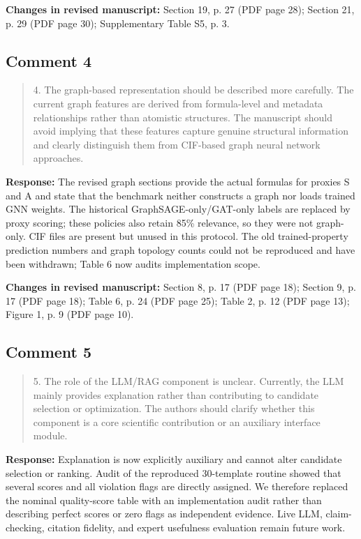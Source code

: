 \documentclass[11pt,a4paper]{article}
\begin{document}
\textbf{Changes in revised manuscript:} Section 19, p. 27 (PDF page 28); Section 21, p. 29 (PDF page 30); Supplementary Table S5, p. 3.

\subsection*{Comment 4}
\begin{quote}\small 4. The graph-based representation should be described more carefully. The current graph features are derived from formula-level and metadata relationships rather than atomistic structures. The manuscript should avoid implying that these features capture genuine structural information and clearly distinguish them from CIF-based graph neural network approaches.\end{quote}
\textbf{Response:} The revised graph sections provide the actual formulas for proxies S and A and state that the benchmark neither constructs a graph nor loads trained GNN weights. The historical GraphSAGE-only/GAT-only labels are replaced by proxy scoring; these policies also retain 85\% relevance, so they were not graph-only. CIF files are present but unused in this protocol. The old trained-property prediction numbers and graph topology counts could not be reproduced and have been withdrawn; Table 6 now audits implementation scope.

\textbf{Changes in revised manuscript:} Section 8, p. 17 (PDF page 18); Section 9, p. 17 (PDF page 18); Table 6, p. 24 (PDF page 25); Table 2, p. 12 (PDF page 13); Figure 1, p. 9 (PDF page 10).

\subsection*{Comment 5}
\begin{quote}\small 5. The role of the LLM/RAG component is unclear. Currently, the LLM mainly provides explanation rather than contributing to candidate selection or optimization. The authors should clarify whether this component is a core scientific contribution or an auxiliary interface module.\end{quote}
\textbf{Response:} Explanation is now explicitly auxiliary and cannot alter candidate selection or ranking. Audit of the reproduced 30-template routine showed that several scores and all violation flags are directly assigned. We therefore replaced the nominal quality-score table with an implementation audit rather than describing perfect scores or zero flags as independent evidence. Live LLM, claim-checking, citation fidelity, and expert usefulness evaluation remain future work.
\end{document}
